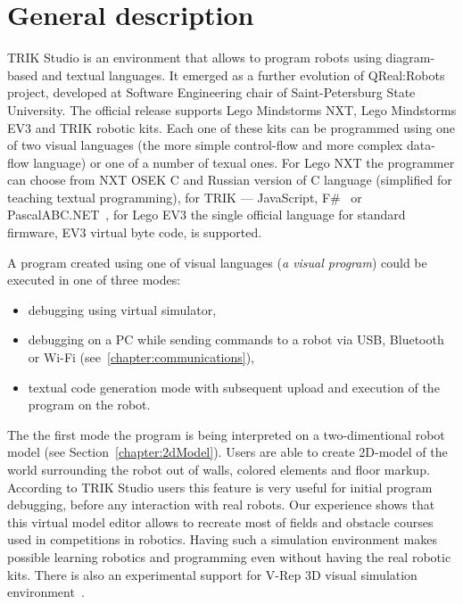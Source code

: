 \documentclass[conference]{IEEEtran}
\begin{document}
\section{General description}
\label{chapter:generalDescription}

TRIK Studio is an environment that allows to program robots using diagram-based and textual languages. It 	emerged as a further evolution of QReal:Robots~\cite{terekhov2013sreda} project, developed at Software Engineering chair of Saint-Petersburg State University. The official release supports Lego Mindstorms NXT, Lego Mindstorms EV3 and TRIK robotic kits. Each one of these kits can be programmed using one of two visual languages (the more simple control-flow and more complex data-flow language) or one of a number of texual ones. For Lego NXT the programmer can choose from NXT OSEK C and Russian version of C language (simplified for teaching textual programming), for TRIK --- JavaScript, F\#~\cite{kirsanov2014robotics} or PascalABC.NET~\cite{doliner2014basics}, for Lego EV3 the single official language for standard firmware, EV3 virtual byte code, is supported.

A program created using one of visual languages (\textit{a visual program}) could be executed in one of three modes:
\begin{itemize}
    \item debugging using virtual simulator,
    \item debugging on a PC while sending commands to a robot via USB, Bluetooth or Wi-Fi (see~\ref{chapter:communications}),
    \item textual code generation mode with subsequent upload and execution of the program on the robot.
\end{itemize}

The the first mode the program is being interpreted on a two-dimentional robot model (see Section~\ref{chapter:2dModel}). Users are able to create 2D-model of the world surrounding the robot out of walls, colored elements and floor markup. According to TRIK Studio users this feature is very useful for initial program debugging, before any interaction with real robots. Our experience shows that this virtual model editor allows to recreate most of fields and obstacle courses used in competitions in robotics. Having such a simulation environment makes possible learning robotics and programming even without having the real robotic kits. There is also an experimental support for V-Rep 3D visual simulation environment~\cite{rohmer2013v}.
\end{document}
